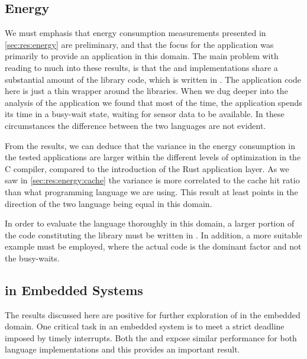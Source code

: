 \subsection{Energy}

We must emphasis that energy consumption measurements presented in \autoref{sec:res:energy} are preliminary, and that the focus for the {\tracker} application was primarily to provide an application in this domain.
The main problem with reading to much into these results, is that the {\rust} and {\C} implementations share a substantial amount of the library code, which is written in {\C}.
The application code here is just a thin wrapper around the libraries.
When we dug deeper into the analysis of the application we found that most of the time, the application spends its time in a busy-wait state, waiting for sensor data to be available.
In these circumstances the difference between the two languages are not evident.

From the results, we can deduce that the variance in the energy consumption in the tested applications are larger within the different levels of optimization in the C compiler, compared to the introduction of the Rust application layer.
As we saw in \autoref{sec:res:energy:cache} the variance is more correlated to the cache hit ratio than what programming language we are using.
This result at least points in the direction of the two language being equal in this domain.

In order to evaluate the {\rust} language thoroughly in this domain, a larger portion of the code constituting the library must be written in {\rust}.
In addition, a more suitable example must be employed, where the actual code is the dominant factor and not the busy-waits.

\subsection{{\rust} in Embedded Systems}

The results discussed here are positive for further exploration of {\rust} in the embedded domain.
One critical task in an embedded system is to meet a strict deadline imposed by timely interrupts.
Both the {\tracker} and {\cg} expose similar performance for both language implementations and this provides an important result.

